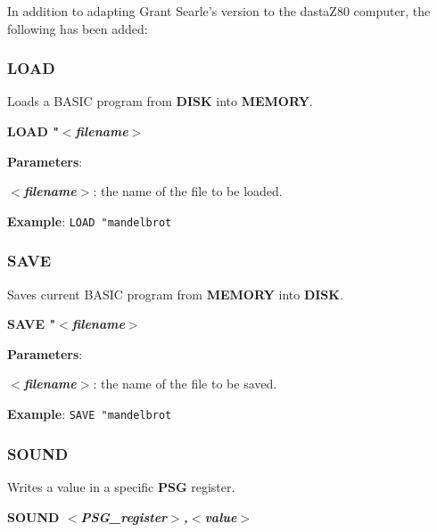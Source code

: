 \documentclass[a4paper,11pt]{article}
\begin{document}
    In addition to adapting Grant Searle's version to the dastaZ80 computer,
    the following has been added:

    \subsubsection{{\color{blue}LOAD}}
    Loads a BASIC program from \textbf{DISK} into \textbf{MEMORY}.

    \hspace{1.9cm}\textbf{LOAD "\textit{$<$filename$>$}}

    \textbf{Parameters}:

    \hspace{1cm}\textbf{\textit{$<$filename$>$}}: the name of the file to be
    loaded.

    \textbf{Example}: \texttt{LOAD "mandelbrot}

    \subsubsection{{\color{blue}SAVE}}
    Saves current BASIC program from \textbf{MEMORY} into \textbf{DISK}.

    \hspace{1.9cm}\textbf{SAVE "\textit{$<$filename$>$}}

    \textbf{Parameters}:

    \hspace{1cm}\textbf{\textit{$<$filename$>$}}: the name of the file to be
    saved.

    \textbf{Example}: \texttt{SAVE "mandelbrot}


    \subsubsection{{\color{blue}SOUND}}
    Writes a value in a specific \textbf{PSG} register.

    \hspace{1.9cm}\textbf{SOUND \textit{$<$PSG\_register$>$,$<$value$>$}}
\end{document}
